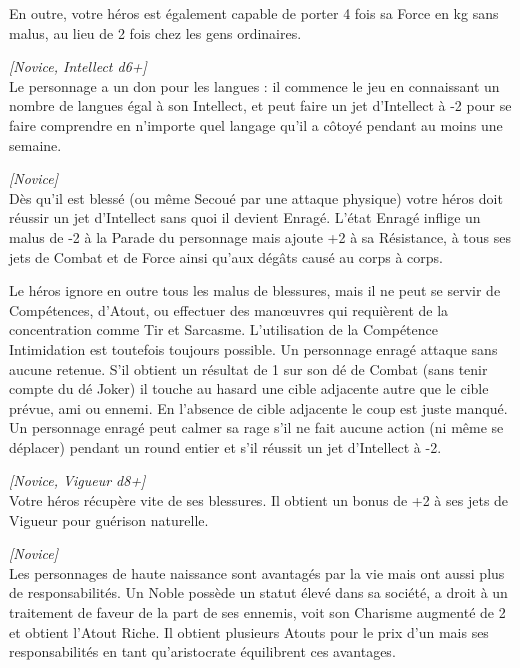 \begin{description}[align=left]
		En outre, votre héros est également capable de porter 4 fois sa Force en kg sans malus, au lieu de 2 fois chez les gens ordinaires.

    \item [Don des langues]
    	\emph{[Novice, Intellect d6+]}\\
        Le personnage a un don pour les langues : il commence le jeu en connaissant un nombre de langues égal à son Intellect, et peut faire un jet d’Intellect à -2 pour se faire comprendre en n’importe quel langage qu’il a côtoyé pendant au moins une semaine.

    \item [Enragé]
    	\emph{[Novice]}\\
        Dès qu’il est blessé (ou même Secoué par une attaque physique) votre héros doit réussir un jet d’Intellect sans quoi il devient Enragé. L’état Enragé inflige un malus de -2 à la Parade du personnage mais ajoute +2 à sa Résistance, à tous ses jets de Combat et de Force ainsi qu’aux dégâts causé au corps à corps. 

        Le héros ignore en outre tous les malus de blessures, mais il ne peut se servir de Compétences, d’Atout, ou effectuer des man\oe{uvres} qui requièrent de la concentration comme Tir et Sarcasme. L’utilisation de la Compétence Intimidation est toutefois toujours possible. Un personnage enragé attaque sans aucune retenue. S’il obtient un résultat de 1 sur son dé de Combat (sans tenir compte du dé Joker) il touche au hasard une cible adjacente autre que le cible prévue, ami ou ennemi. En l’absence de cible adjacente le coup est juste manqué. Un personnage enragé peut calmer sa rage s’il ne fait aucune action (ni même se déplacer) pendant un round entier et s’il réussit un jet d’Intellect à -2.

    \item [Guérison rapide]
    	\emph{[Novice, Vigueur d8+]}\\
        Votre héros récupère vite de ses blessures. Il obtient un bonus de +2 à ses jets de Vigueur pour guérison naturelle.

    \item [Noble]
    	\emph{[Novice]}\\
        Les personnages de haute naissance sont avantagés par la vie mais ont aussi plus de responsabilités. Un Noble possède un statut élevé dans sa société, a droit à un traitement de faveur de la part de ses ennemis, voit son Charisme augmenté de 2 et obtient l’Atout Riche. Il obtient plusieurs Atouts pour le prix d’un mais ses responsabilités en tant qu’aristocrate équilibrent ces avantages. 


\end{description}
